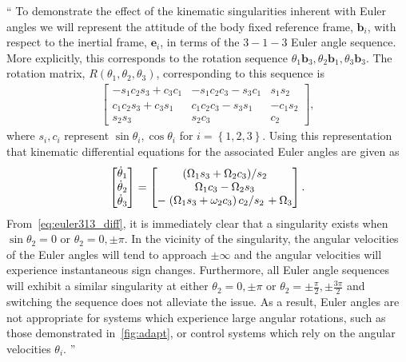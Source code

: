 \documentclass[11pt]{article}
\newcommand{\braces}[1]{\ensuremath{\left\{ #1 \right\}}}
\newcommand{\parenth}[1]{\ensuremath{\left( #1 \right)}}
\newcommand{\vecbf}[1]{\bm{#1}}
\newcommand{\slfrac}[2]{\left.#1\middle/#2\right.}
\newenvironment{correction}{\begin{list}{}{\setlength{\leftmargin}{1cm}\setlength{\rightmargin}{1cm}}\vspace{\parsep}\item[]``}{''\end{list}}
\begin{document}
\begin{enumerate}
\begin{correction}
To demonstrate the effect of the kinematic singularities inherent with Euler angles we will represent the attitude of the body fixed reference frame, \( \vecbf{b}_i \), with respect to the inertial frame, \( \vecbf{e}_i\), in terms of the \( 3-1-3\) Euler angle sequence.
More explicitly, this corresponds to the rotation sequence \( \theta_1 \vecbf{b}_3 , \theta_2 \vecbf{b}_1, \theta_3 \vecbf{b}_3 \).
The rotation matrix, \( R(\theta_1, \theta_2, \theta_3) \), corresponding to this sequence is 
\begin{align}\label{eq:euler313}
    \begin{bmatrix}
        -s_1 c_2 s_3 + c_3 c_1 & -s_1 c_2 c_3 - s_3 c_1 & s_1s_2 \\
        c_1 c_2 s_3 + c_3 s_1 & c_1 c_2 c_3 - s_3 s_1 & - c_1 s_2 \\
        s_2 s_3 & s_2 c_3 & c_2
    \end{bmatrix} ,
\end{align}
where \( s_i, c_i \) represent \( \sin \theta_i, \cos \theta_i \) for \( i = \braces{1,2,3}\).
Using this representation that kinematic differential equations for the associated Euler angles are given as
\begin{align}\label{eq:euler313_diff}
    \begin{bmatrix}
        \dot{\theta}_1 \\ \dot{\theta}_2 \\ \dot{\theta}_3 
    \end{bmatrix}
    =
    \begin{bmatrix}
        \slfrac{\parenth{\Omega_1 s_3 + \Omega_2 c_3}}{s_2} \\
        \Omega_1 c_3 - \Omega_2 s_3 \\
        -\slfrac{\parenth{\Omega_1 s_3 + \omega_2 c_3}c_2}{s_2} + \Omega_3
    \end{bmatrix} .
\end{align}
From~\cref{eq:euler313_diff}, it is immediately clear that a singularity exists when \( \sin \theta_2 = 0 \) or \( \theta_2 = 0, \pm \pi \). 
In the vicinity of the singularity, the angular velocities of the Euler angles will tend to approach \( \pm \infty \) and the angular velocities will experience instantaneous sign changes.
Furthermore, all Euler angle sequences will exhibit a similar singularity at either \( \theta_2 = 0, \pm \pi \) or \( \theta_2 = \pm \frac{\pi}{2}, \pm \frac{3\pi}{2} \) and switching the sequence does not alleviate the issue.
As a result, Euler angles are not appropriate for systems which experience large angular rotations, such as those demonstrated in~\cref{fig:adapt}, or control systems which rely on the angular velocities \( \theta_i \).
\end{correction}


\end{enumerate}
\end{document}
